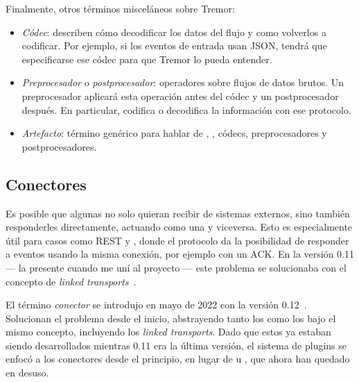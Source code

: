 Finalmente, otros términos misceláneos sobre Tremor:

\begin{itemize}
    \item \emph{Códec}: describen cómo decodificar los datos del flujo y como
        volverlos a codificar. Por ejemplo, si los eventos de entrada usan JSON,
        tendrá que especificarse ese códec para que Tremor lo pueda entender.

    \item \emph{Preprocesador} o \emph{postprocesador}: operadores sobre flujos
        de datos brutos. Un preprocesador aplicará esta operación antes del
        códec y un postprocesador después. En particular,  codifica
        o decodifica la información con ese protocolo.

    \item \emph{Artefacto}: término genérico para hablar de \sinks, \sources,
        códecs, preprocesadores y postprocesadores.

\end{itemize}

\subsection{Conectores}

Es posible que algunas \onramps no solo quieran recibir de sistemas externos,
sino también responderles directamente, actuando como una \offramp y viceversa.
Esto es especialmente útil para casos como REST y \websockets, donde el
protocolo da la posibilidad de responder a eventos usando la misma conexión, por
ejemplo con un ACK. En la versión 0.11 --- la presente cuando me uní al proyecto
--- este problema se solucionaba con el concepto de \emph{linked
transports}~\cite{tremorlinkedtransports}.

El término \emph{conector} se introdujo en mayo de 2022 con la versión
0.12~\cite{tremorconnectors}. Solucionan el problema desde el inicio,
abstrayendo tanto los \onramps como los \offramps bajo el mismo concepto,
incluyendo los \emph{linked transports}. Dado que estos ya estaban siendo
desarrollados mientras 0.11 era la última versión, el sistema de plugins se
enfocó a los conectores desde el principio, en lugar de \onramps u \offramps,
que ahora han quedado en desuso.

